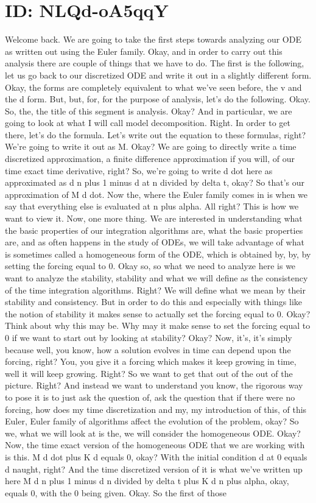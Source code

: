 \documentclass[10pt]{article}
\begin{document}
\section*{ID: NLQd-oA5qqY}
Welcome back. We are going to take the first steps towards analyzing our ODE as written out using the Euler family. Okay, and in order to carry out this analysis there are couple of things that we have to do. The first is the following, let us go back to our discretized ODE and write it out in a slightly different form. Okay, the forms are completely equivalent to what we've seen before, the v and the d form. But, but, for, for the purpose of analysis, let's do the following. Okay. So, the, the title of this segment is analysis. Okay? And in particular, we are going to look at what I will call model decomposition. Right. In order to get there, let's do the formula. Let's write out the equation to these formulas, right? We're going to write it out as M. Okay? We are going to directly write a time discretized approximation, a finite difference approximation if you will, of our time exact time derivative, right? So, we're going to write d dot here as approximated as d n plus 1 minus d at n divided by delta t, okay? So that's our approximation of M d dot. Now the, where the Euler family comes in is when we say that everything else is evaluated at n plus alpha. All right? This is how we want to view it. Now, one more thing. We are interested in understanding what the basic properties of our integration algorithms are, what the basic properties are, and as often happens in the study of ODEs, we will take advantage of what is sometimes called a homogeneous form of the ODE, which is obtained by, by, by setting the forcing equal to 0. Okay so, so what we need to analyze here is we want to analyze the stability, stability and what we will define as the consistency of the time integration algorithms. Right? We will define what we mean by their stability and consistency. But in order to do this and especially with things like the notion of stability it makes sense to actually set the forcing equal to 0. Okay? Think about why this may be. Why may it make sense to set the forcing equal to 0 if we want to start out by looking at stability? Okay? Now, it's, it's simply because well, you know, how a solution evolves in time can depend upon the forcing, right? You, you give it a forcing which makes it keep growing in time, well it will keep growing. Right? So we want to get that out of the out of the picture. Right? And instead we want to understand you know, the rigorous way to pose it is to just ask the question of, ask the question that if there were no forcing, how does my time discretization and my, my introduction of this, of this Euler, Euler family of algorithms affect the evolution of the problem, okay? So we, what we will look at is the, we will consider the homogeneous ODE. Okay? Now, the time exact version of the homogeneous ODE that we are working with is this. M d dot plus K d equals 0, okay? With the initial condition d at 0 equals d naught, right? And the time discretized version of it is what we've written up here M d n plus 1 minus d n divided by delta t plus K d n plus alpha, okay, equals 0, with the 0 being given. Okay. So the first of those 
\end{document}
